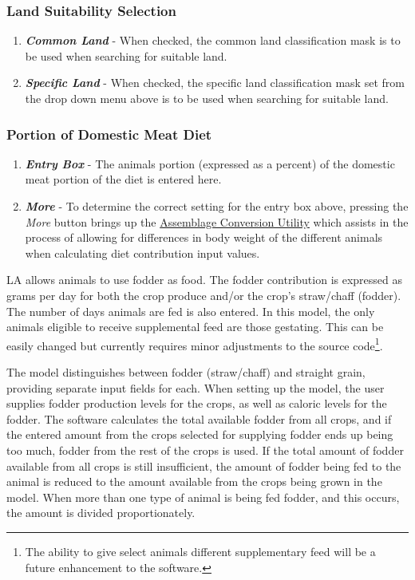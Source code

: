 \subsubsection{Land Suitability Selection}
\begin{enumerate}
  \item \textit{\textbf{Common Land}} - When checked, the common land classification mask is to be used when searching for suitable land.
  \item \textit{\textbf{Specific Land}} - When checked, the specific land classification mask set from the drop down menu above is to be used when searching for suitable land.
\end{enumerate}

\subsubsection{Portion of Domestic Meat Diet}
\begin{enumerate}
  \item \textit{\textbf{Entry Box}} - The animals portion (expressed as a percent) of the domestic meat portion of the diet is entered here.
  \item \textit{\textbf{More}} - To determine the correct setting for the entry box above, pressing the \emph{More} button brings up the \hyperref[LACalculator]{Assemblage Conversion Utility} which assists in the process of allowing for differences in body weight of the different animals when calculating diet contribution input values.
\end{enumerate}
 
LA allows animals to use fodder as food. The fodder contribution is expressed as grams per day for both the crop produce and/or the crop's straw/chaff (fodder).  The number of days animals are fed is also entered.  In this model, the only animals eligible to receive supplemental feed are those gestating.  This can be easily changed but currently requires minor adjustments to the source code\footnote{The ability to give select animals different supplementary feed will be a future enhancement to the software.}.  

The model distinguishes between fodder (straw/chaff) and straight grain, providing separate input fields for each.  When setting up the model, the user supplies fodder production levels for the crops, as well as caloric levels for the fodder. The software calculates the total available fodder from all crops, and if the entered amount from the crops selected for supplying fodder ends up being too much, fodder from the rest of the crops is used.  If the total amount of fodder available from all crops is still insufficient, the amount of fodder being fed to the animal is reduced to the amount available from the crops being grown in the model.  When more than one type of animal is being fed fodder, and this occurs, the amount is divided proportionately. 



